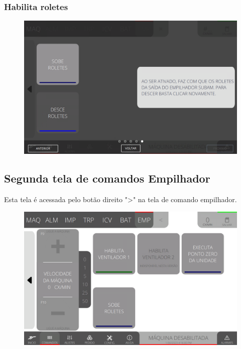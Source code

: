\newpage
\thispagestyle{fancy}
\vspace*{40 pt}
\subsubsection{\small {Habilita roletes}} \label{sec:telaComandosEmpilhadorHabilitaRoletes}
\vspace*{\fill}
\begin{figure}[h]
    \centering
    \includegraphics[width=576 px,height=360 px]{src/imagesICV/08-stacker/commands/e-5.png}
\end{figure}
\vspace*{\fill}

\newpage
\thispagestyle{fancy}
\vspace*{40 pt}
\subsection{Segunda tela de comandos Empilhador} \label{sec:telaComandosEmpilhador2}
Esta tela é acessada pelo botão direito "\textgreater" na tela de comando empilhador.
\vspace*{\fill}
\begin{figure}[h]
    \centering
    \includegraphics[width=480 px,height=300 px]{src/imagesICV/08-stacker/commands/Tela-Principal-2.png}
\end{figure}
\vspace*{\fill}

